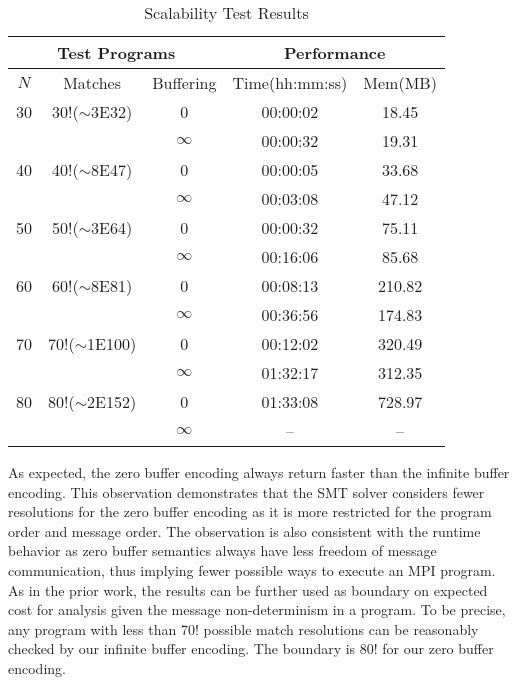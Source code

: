 \begin{table}[t]
\begin{center}
\scriptsize
\caption{Scalability Test Results}\label{table:scalability}
\begin{tabular}{|c|c|c|c|c|}
		\hline
         \multicolumn{3}{|c|}{Test Programs} & \multicolumn{2}{|c|}{Performance} \\ \hline
          $\mathit{N}$ & Matches & Buffering  & Time(hh:mm:ss) & Mem(MB) \\ \hline
          30 & 30!($\sim$3E32) & 0 & 00:00:02 & 18.45\\
               & & $\infty$ & 00:00:32 & 19.31 \\ \hline
          40 & 40!($\sim$8E47) & 0 & 00:00:05 & 33.68\\
               &  & $\infty$ & 00:03:08 & 47.12 \\ \hline
          50 & 50!($\sim$3E64) & 0 & 00:00:32 & 75.11\\
               & & $\infty$ & 00:16:06 & 85.68\\ \hline
          60 & 60!($\sim$8E81) & 0 & 00:08:13 & 210.82\\
               &  & $\infty$ & 00:36:56 & 174.83\\ \hline
          70 & 70!($\sim$1E100) & 0 & 00:12:02 & 320.49\\
               & & $\infty$ & 01:32:17 & 312.35\\ \hline
          80 & 80!($\sim$2E152) & 0 & 01:33:08 & 728.97\\
               & & $\infty$ & -- & --\\ \hline         
		\end{tabular}
\end{center}
\end{table}

As expected, the zero buffer encoding always return faster than the infinite buffer encoding. This observation demonstrates that the SMT solver considers fewer resolutions for the zero buffer encoding as it is more restricted for the program order and message order. The observation is also consistent with the runtime behavior as zero buffer semantics always have less freedom of message communication, thus implying fewer possible ways to execute an MPI program. As in the prior work, the results can be further used as boundary on expected cost for analysis given the message non-determinism in a program. To be precise, any program with less than 70! possible match resolutions can be reasonably checked by our infinite buffer encoding. The boundary is 80! for our zero buffer encoding.

